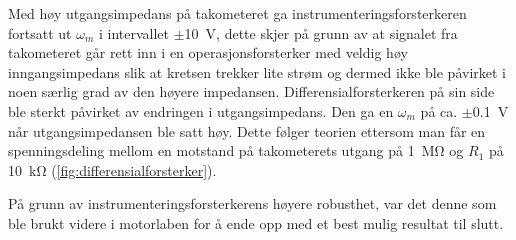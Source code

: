 Med høy utgangsimpedans på takometeret ga instrumenteringsforsterkeren fortsatt ut $\omega_m$ i intervallet $\pm${\SI{10}{\volt}}, dette skjer på grunn av at signalet fra takometeret går rett inn i en operasjonsforsterker med veldig høy inngangsimpedans slik at kretsen trekker lite strøm og dermed ikke ble påvirket i noen særlig grad av den høyere impedansen. 
Differensialforsterkeren på sin side ble sterkt påvirket av endringen i utgangsimpedans. Den ga en $\omega_m$ på ca. $\pm${\SI{0.1}{\volt}} når utgangsimpedansen ble satt høy. Dette følger teorien ettersom man får en spenningsdeling mellom en motstand på takometerets utgang på {\SI{1}{\mega\ohm}}\cite{AnalogMotorlabbOppgaver} og $R_1$ på {\SI{10}{\kilo\ohm}} (\autoref{fig:differensialforsterker}).

På grunn av instrumenteringsforsterkerens høyere robusthet, var det denne som ble brukt videre i motorlaben for å ende opp med et best mulig resultat til slutt.
